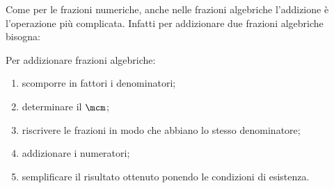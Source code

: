 Come per le frazioni numeriche, anche nelle frazioni algebriche 
l'addizione è l'operazione più complicata. Infatti per addizionare due 
frazioni algebriche bisogna:

\begin{procedura}{}{}
Per addizionare frazioni algebriche:
\begin{enumerate} [label=\alph*), noitemsep]
\item scomporre in fattori i denominatori;
\item determinare il \(\mcm\);
\item riscrivere le frazioni in modo che abbiano lo stesso denominatore;
\item addizionare i numeratori;
\item semplificare il risultato ottenuto ponendo le condizioni di 
esistenza.
\end{enumerate}
\end{procedura}

